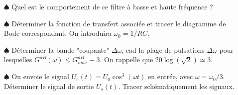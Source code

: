 \documentclass{report}
\begin{document}
\begin{itemize}

	\item[$\spadesuit$] Quel est le comportement de ce filtre à basse et haute fréquence ? 
	
	\item[$\spadesuit$] Déterminer la fonction de transfert associée et tracer le diagramme de Bode correspondant. On introduira $\omega_0=1/RC$.
	
	\item[$\spadesuit$] Déterminer la bande "coupante" $\Delta\omega$, cad la plage de pulsations $\Delta\omega$ pour lesquelles $G^{dB}(\omega)\leq G^{dB}_{max} - 3$. On rappelle que $20\log\left( \sqrt{2}\right)\simeq3 $.
	
	\item[$\spadesuit$] On envoie le signal $U_e(t)=U_0\cos^3(\omega t)$ en entrée, avec $\omega=\omega_0/3$. Déterminer le signal de sortie $U_s(t)$. Tracer schématiquement les signaux.

\end{itemize}

\newpage
\end{document}

